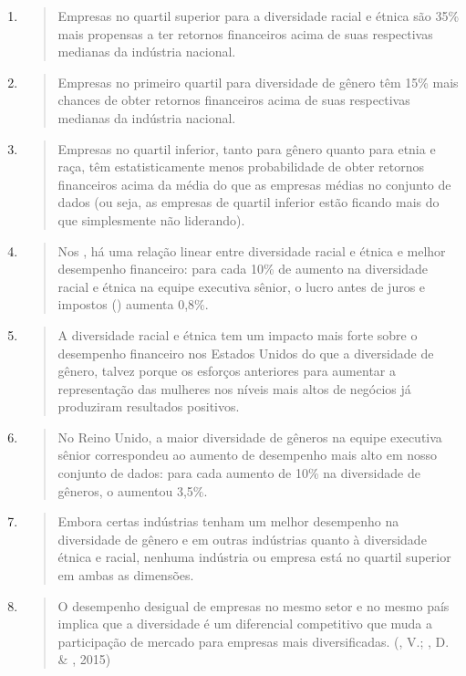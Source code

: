 \begin{enumerate}
\def\labelenumi{\arabic{enumi}.}
\item
  \begin{quote}
  Empresas no quartil superior para a diversidade racial e étnica são
  35\% mais propensas a ter retornos financeiros acima de suas
  respectivas medianas da indústria nacional.
  \end{quote}
\item
  \begin{quote}
  Empresas no primeiro quartil para diversidade de gênero têm 15\% mais
  chances de obter retornos financeiros acima de suas respectivas
  medianas da indústria nacional.
  \end{quote}
\item
  \begin{quote}
  Empresas no quartil inferior, tanto para gênero quanto para etnia e
  raça, têm estatisticamente menos probabilidade de obter retornos
  financeiros acima da média do que as empresas médias no conjunto de
  dados (ou seja, as empresas de quartil inferior estão ficando mais do
  que simplesmente não liderando).
  \end{quote}
\item
  \begin{quote}
  Nos , há uma relação linear entre diversidade racial e étnica e
  melhor desempenho financeiro: para cada 10\% de aumento na diversidade
  racial e étnica na equipe executiva sênior, o lucro antes de juros e
  impostos () aumenta 0,8\%.
  \end{quote}
\item
  \begin{quote}
  A diversidade racial e étnica tem um impacto mais forte sobre o
  desempenho financeiro nos Estados Unidos do que a diversidade de
  gênero, talvez porque os esforços anteriores para aumentar a
  representação das mulheres nos níveis mais altos de negócios já
  produziram resultados positivos.
  \end{quote}
\item
  \begin{quote}
  No Reino Unido, a maior diversidade de gêneros na equipe executiva
  sênior correspondeu ao aumento de desempenho mais alto em nosso
  conjunto de dados: para cada aumento de 10\% na diversidade de
  gêneros, o  aumentou 3,5\%.
  \end{quote}
\item
  \begin{quote}
  Embora certas indústrias tenham um melhor desempenho na diversidade de
  gênero e em outras indústrias quanto à diversidade étnica e racial,
  nenhuma indústria ou empresa está no quartil superior em ambas as
  dimensões.
  \end{quote}
\item
  \begin{quote}
  O desempenho desigual de empresas no mesmo setor e no mesmo país
  implica que a diversidade é um diferencial competitivo que muda a
  participação de mercado para empresas mais diversificadas. (, V.;
  , D. \& , 2015)
  \end{quote}
\end{enumerate}

